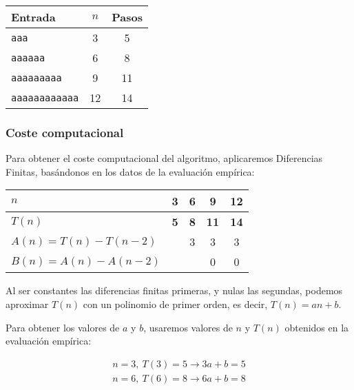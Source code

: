 \begin{table}[h]
    \centering
    \begin{tabular}{lcc}
        Entrada & $n$ & Pasos \\
        \hline
        \texttt{aaa}                &  3  & 5 \\
        \texttt{aaaaaa}             &  6  & 8 \\
        \texttt{aaaaaaaaa}          &  9  & 11 \\
        \texttt{aaaaaaaaaaaa}       & 12  & 14 \\
    \end{tabular}
\end{table}


\subsubsection*{Coste computacional}
Para obtener el coste computacional del algoritmo, aplicaremos Diferencias Finitas, basándonos en los datos de la evaluación empírica:

\begin{table}[H]
    \centering
    \begin{tabular}{|l|c|c|c|c|}
        \hline
        $n$    & \textbf{3} & \textbf{6} & \textbf{9}  & \textbf{12} \\ \hline
        $T(n)$ & \textbf{5} & \textbf{8} & \textbf{11} & \textbf{14} \\ \hline
        \hline
        $A(n) = T(n) - T(n-2)$ &   & 3 & 3 & 3 \\ \hline
        $B(n) = A(n) - A(n-2)$ &   &   & 0 & 0 \\ \hline
    \end{tabular}
\end{table}

Al ser constantes las diferencias finitas primeras, y nulas las segundas, podemos aproximar $T(n)$ con un polinomio de primer orden, es decir, $T(n) = an + b$.\medskip

Para obtener los valores de $a$ y $b$, usaremos valores de $n$ y $T(n)$ obtenidos en la evaluación empírica:

\begin{subequations}
    \begin{gather}
        n = 3,\ T(3) = 5 \rightarrow 3a + b = 5 \\
        n = 6,\ T(6) = 8 \rightarrow 6a + b = 8
    \end{gather}
\end{subequations}


